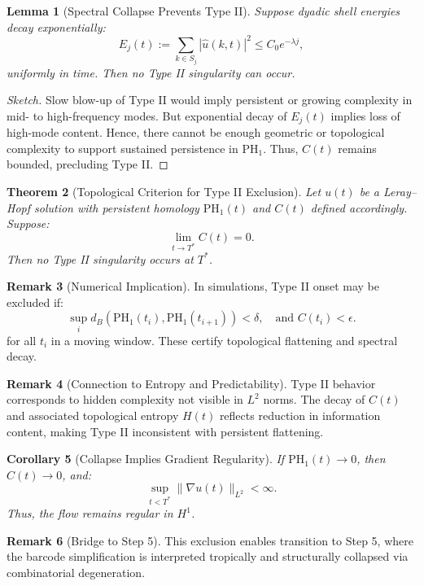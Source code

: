 \documentclass[11pt]{article}
\newtheorem{theorem}{Theorem}[section]
\newtheorem{lemma}[theorem]{Lemma}
\newtheorem{corollary}[theorem]{Corollary}
\theoremstyle{definition}
\newtheorem{remark}[theorem]{Remark}
\begin{document}
\begin{lemma}[Spectral Collapse Prevents Type II]
Suppose dyadic shell energies decay exponentially:
\[
E_j(t) := \sum_{k \in S_j} |\hat{u}(k,t)|^2 \leq C_0 e^{-\lambda j},
\]
uniformly in time. Then no Type II singularity can occur.
\end{lemma}

\begin{proof}[Sketch]
Slow blow-up of Type II would imply persistent or growing complexity in mid- to high-frequency modes. But exponential decay of $E_j(t)$ implies loss of high-mode content. Hence, there cannot be enough geometric or topological complexity to support sustained persistence in $\mathrm{PH}_1$. Thus, $C(t)$ remains bounded, precluding Type II.
\end{proof}

\begin{theorem}[Topological Criterion for Type II Exclusion]
Let $u(t)$ be a Leray--Hopf solution with persistent homology $\mathrm{PH}_1(t)$ and $C(t)$ defined accordingly. Suppose:
\[
\lim_{t \to T^*} C(t) = 0.
\]
Then no Type II singularity occurs at $T^*$.
\end{theorem}

\begin{remark}[Numerical Implication]
In simulations, Type II onset may be excluded if:
\[
\sup_i d_B(\mathrm{PH}_1(t_i), \mathrm{PH}_1(t_{i+1})) < \delta, \quad \text{and } C(t_i) < \epsilon.
\]
for all $t_i$ in a moving window. These certify topological flattening and spectral decay.
\end{remark}

\begin{remark}[Connection to Entropy and Predictability]
Type II behavior corresponds to hidden complexity not visible in $L^2$ norms. The decay of $C(t)$ and associated topological entropy $H(t)$ reflects reduction in information content, making Type II inconsistent with persistent flattening.
\end{remark}

\begin{corollary}[Collapse Implies Gradient Regularity]
If $\mathrm{PH}_1(t) \to 0$, then $C(t) \to 0$, and:
\[
\sup_{t < T^*} \|\nabla u(t)\|_{L^2} < \infty.
\]
Thus, the flow remains regular in $H^1$.
\end{corollary}

\begin{remark}[Bridge to Step 5]
This exclusion enables transition to Step 5, where the barcode simplification is interpreted tropically and structurally collapsed via combinatorial degeneration.
\end{remark}
\end{document}
